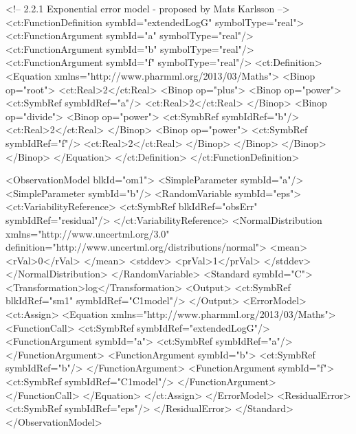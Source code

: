 \documentclass[a4paper,10pt]{article}
\begin{document}
\begin{xmlcode}
<!-- 2.2.1	Exponential error model - proposed by Mats Karlsson -->
<ct:FunctionDefinition symbId="extendedLogG" symbolType="real">
    <ct:FunctionArgument symbId="a" symbolType="real"/>
    <ct:FunctionArgument symbId="b" symbolType="real"/>
    <ct:FunctionArgument symbId="f" symbolType="real"/>
    <ct:Definition>
        <Equation xmlns="http://www.pharmml.org/2013/03/Maths">
            <Binop op="root">
                <ct:Real>2</ct:Real>
                <Binop op="plus">
                    <Binop op="power">
                        <ct:SymbRef symbIdRef="a"/>
                        <ct:Real>2</ct:Real>
                    </Binop>
                    <Binop op="divide">
                        <Binop op="power">
                            <ct:SymbRef symbIdRef="b"/>
                            <ct:Real>2</ct:Real>
                        </Binop>
                        <Binop op="power">
                            <ct:SymbRef symbIdRef="f"/>
                            <ct:Real>2</ct:Real>
                        </Binop>
                    </Binop>
                </Binop>
            </Binop>
        </Equation>
    </ct:Definition>
</ct:FunctionDefinition>

<ObservationModel blkId="om1">
    <SimpleParameter symbId="a"/>
    <SimpleParameter symbId="b"/>
    <RandomVariable symbId="eps">
        <ct:VariabilityReference>
            <ct:SymbRef blkIdRef="obsErr" symbIdRef="residual"/>
        </ct:VariabilityReference>
        <NormalDistribution xmlns="http://www.uncertml.org/3.0" definition="http://www.uncertml.org/distributions/normal">
            <mean>
                <rVal>0</rVal>
            </mean>
            <stddev>
                <prVal>1</prVal>
            </stddev>
        </NormalDistribution>
    </RandomVariable>
    <Standard symbId="C">
        <Transformation>log</Transformation>
        <Output>
            <ct:SymbRef blkIdRef="sm1" symbIdRef="C1model"/>
        </Output>
        <ErrorModel>
            <ct:Assign>
                <Equation xmlns="http://www.pharmml.org/2013/03/Maths">
                    <FunctionCall>
                        <ct:SymbRef symbIdRef="extendedLogG"/>
                        <FunctionArgument symbId="a">
                            <ct:SymbRef symbIdRef="a"/>
                        </FunctionArgument>
                        <FunctionArgument symbId="b">
                            <ct:SymbRef symbIdRef="b"/>
                        </FunctionArgument>
                        <FunctionArgument symbId="f">
                            <ct:SymbRef symbIdRef="C1model"/>
                        </FunctionArgument>
                    </FunctionCall>
                </Equation>
            </ct:Assign>
        </ErrorModel>
        <ResidualError>
            <ct:SymbRef symbIdRef="eps"/>
        </ResidualError>
    </Standard>
</ObservationModel>
\end{xmlcode}
\end{document}
